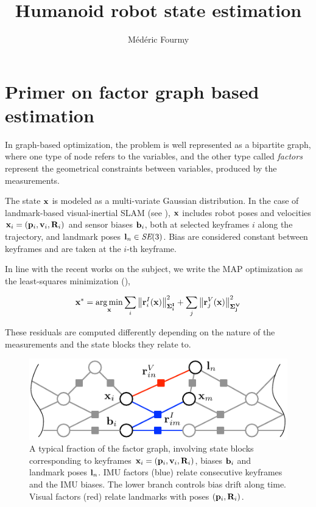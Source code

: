 \documentclass[11pt]{article}
\begin{document}
\author{Médéric Fourmy}
\title{Humanoid robot state estimation}
\maketitle

\section{Primer on factor graph based estimation}

In graph-based optimization, the problem is well represented as a bipartite graph, where one type of node refers to the variables, and the other type called \emph{factors} represent the geometrical constraints between variables, produced by the measurements.

The state ${\bf x}$ is modeled as a multi-variate Gaussian distribution.
In the case of landmark-based visual-inertial SLAM (see ), ${\bf x}$ includes robot poses and velocities ${\bf x}_i=({\bf p}_i,{\bf v}_i,{\bf R}_i)$ and sensor biases ${\bf b}_i$, both at selected keyframes $i$ along the trajectory, and landmark poses ${\bf l}_n\in\textit{SE}(3)$.
Bias are considered constant between keyframes and are taken at the $i$-th keyframe.

In line with the recent works on the subject, we write the MAP optimization as the least-squares minimization (),

\begin{equation}
    {\bf x}^* = \operatorname*{arg\,min}_{\bf x} 
    \sum_i {\left\|{\bf r}^I_i({\bf x})\right\|}_{\bf \Sigma^I_i}^2
    +
    \sum_j {\left\|{\bf r}^V_j({\bf x})\right\|}_{\bf \Sigma^V_j}^2
    \label{eq:leastsquare}
\end{equation}


These residuals are computed differently depending on the nature of the measurements and the state blocks they relate to. 



\begin{figure}[ht]
    \centering
    \includegraphics[scale=0.9]{img/graph}
    \caption{A typical fraction of the factor graph, involving state blocks corresponding to keyframes ${\bf x}_i=({\bf p}_i,{\bf v}_i,{\bf R}_i)$, biases ${\bf b}_i$ and landmark poses ${\bf l}_n$. 
    IMU factors (blue) relate consecutive keyframes and the IMU biases.
    The lower branch controls bias drift along time.
    Visual factors (red) relate landmarks with poses $({\bf p}_i,{\bf R}_i)$.}
    \label{fig:graph}
\end{figure}
\end{document}
